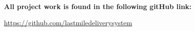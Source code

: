 \textbf{All project work is found in the following gitHub link:}

\url{https://github.com/lastmiledeliverysystem}
